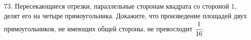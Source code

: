 73. Пересекающиеся отрезки, параллельные сторонам квадрата со стороной 1, делят его на четыре прямоугольника. Докажите, что произведение площадей двух прямоугольников, не имеющих общей стороны, не превосходит $\cfrac{1}{16}.$\\
